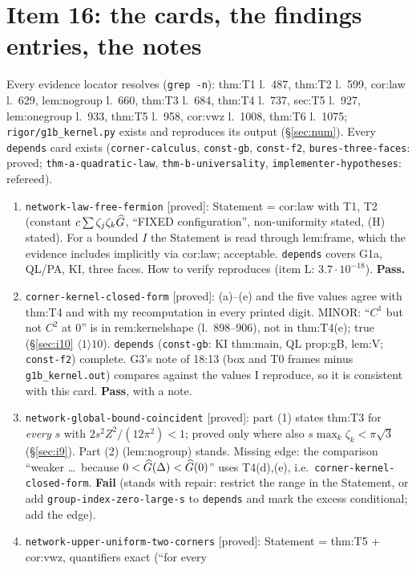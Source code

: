 \documentclass[11pt]{article}
\begin{document}
\section{Item 16: the cards, the findings entries, the notes}\label{sec:i16}
Every evidence locator resolves (\texttt{grep -n}): thm:T1 l.~487, thm:T2 l.~599, cor:law l.~629, lem:nogroup l.~660,
thm:T3 l.~684, thm:T4 l.~737, sec:T5 l.~927, lem:onegroup l.~933, thm:T5 l.~958, cor:vwz l.~1008, thm:T6 l.~1075;
\texttt{rigor/g1b\_kernel.py} exists and reproduces its output (\S\ref{sec:num}).  Every \texttt{depends} card exists
(\texttt{corner-calculus}, \texttt{const-gb}, \texttt{const-f2}, \texttt{bures-three-faces}: proved;
\texttt{thm-a-quadratic-law}, \texttt{thm-b-universality}, \texttt{implementer-hypotheses}: refereed).
\begin{enumerate}[leftmargin=1.5em,label=(\roman*)]
\item \texttt{network-law-free-fermion} [proved]: Statement = cor:law with T1, T2 (constant $c\sum\zeta_j\zeta_k\widehat G$,
 ``FIXED configuration'', non-uniformity stated, (H) stated).  For a bounded $I$ the Statement is read through
 lem:frame, which the evidence includes implicitly via cor:law; acceptable.  \texttt{depends} covers G1a, QL/PA, KI,
 three faces.  How to verify reproduces (item L: $3.7\cdot10^{-18}$).  \textbf{Pass.}
\item \texttt{corner-kernel-closed-form} [proved]: (a)--(e) and the five values agree with thm:T4 and with my
 recomputation in every printed digit.  MINOR: ``$C^1$ but not $C^2$ at $0$'' is in rem:kernelshape (l.~898--906), not in
 thm:T4(e); true (\S\ref{sec:i10} $\langle1\rangle10$).  \texttt{depends} (\texttt{const-gb}: KI thm:main, QL prop:gB,
 lem:V; \texttt{const-f2}) complete.  G3's note of 18:13 (box and T0 frames minus \texttt{g1b\_kernel.out}) compares
 against the values I reproduce, so it is consistent with this card.  \textbf{Pass}, with a note.
\item \texttt{network-global-bound-coincident} [proved]: part (1) states thm:T3 for \emph{every} $s$ with
 $2s^2Z^2/(12\pi^2)<1$; proved only where also $s\max_k\zeta_k<\pi\sqrt3$ (\S\ref{sec:i9}).  Part (2) (lem:nogroup)
 stands.  Missing edge: the comparison ``weaker \dots\ because $0<\widehat G(\Delta)<\widehat G(0)$'' uses T4(d),(e), i.e.\
 \texttt{corner-kernel-closed-form}.  \textbf{Fail} (stands with repair: restrict the range in the Statement,
 or add \texttt{group-index-zero-large-s} to \texttt{depends} and mark the excess conditional; add the edge).
\item \texttt{network-upper-uniform-two-corners} [proved]: Statement = thm:T5 + cor:vwz, quantifiers exact (``for every

\end{enumerate}
\end{document}
